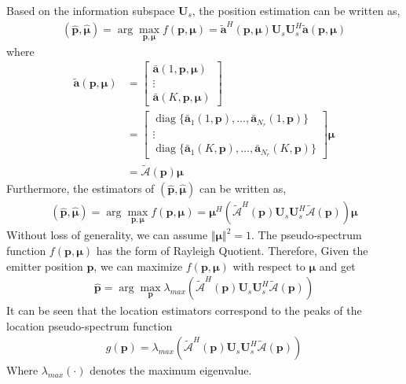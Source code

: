 \documentclass[journal,10pt]{IEEEtran}
\def \diag{\operatorname{diag}}
\def \arg{\operatorname{arg}}
\begin{document}
Based on the information subspace $\boldsymbol{U}_s$, the position estimation can be written as,
\begin{align}\label{eq:18}
    (\hat{\boldsymbol{p}},\hat{\boldsymbol{\mu}})=\arg \max_{\boldsymbol{p},\boldsymbol{\mu}} f(\boldsymbol{p},\boldsymbol{\mu})=\tilde{\boldsymbol{a}}^H(\boldsymbol{p},\boldsymbol{\mu})\boldsymbol{U}_s\boldsymbol{U}_s^H\tilde{\boldsymbol{a}}(\boldsymbol{p},\boldsymbol{\mu})
\end{align}
where 
\begin{align}\label{eq:19}
    \tilde{\boldsymbol{a}}(\boldsymbol{p},\boldsymbol{\mu})&=\left[
        \begin{array}{c}
            \bar{\boldsymbol{a}}(1,\boldsymbol{p},\boldsymbol{\mu})\\
            \vdots\\
            \bar{\boldsymbol{a}}(K,\boldsymbol{p},\boldsymbol{\mu})
        \end{array}
    \right]\\
    &=\left[
    \begin{array}{c}
        \diag\{\bar{\boldsymbol{a}}_1(1,\boldsymbol{p}),\dots,\bar{\boldsymbol{a}}_{N_r}(1,\boldsymbol{p})\}\\
        \vdots\\
        \diag\{\bar{\boldsymbol{a}}_1(K,\boldsymbol{p}),\dots,\bar{\boldsymbol{a}}_{N_r}(K,\boldsymbol{p})\}
    \end{array}        
    \right]\boldsymbol{\mu}\\
    &=\tilde{\mathcal{A}}(\boldsymbol{p})\boldsymbol{\mu}
\end{align}
Furthermore, the estimators of $(\hat{\boldsymbol{p}},\hat{\boldsymbol{\mu}})$ can be written as,
\begin{align}\label{eq:20}
    (\hat{\boldsymbol{p}},\hat{\boldsymbol{\mu}})=\arg \max_{\boldsymbol{p},\boldsymbol{\mu}} f(\boldsymbol{p},\boldsymbol{\mu})=\boldsymbol{\mu}^H(\tilde{\mathcal{A}}^H(\boldsymbol{p})\boldsymbol{U}_s\boldsymbol{U}_s^H\tilde{\mathcal{A}}(\boldsymbol{p}))\boldsymbol{\mu}
\end{align}
Without loss of generality, we can assume $\Vert \boldsymbol{\mu}\Vert ^2=1$. The pseudo-spectrum function $f(\boldsymbol{p},\boldsymbol{\mu})$ has the form of Rayleigh Quotient. 
Therefore, Given the emitter position $\boldsymbol{p}$, we can maximize $f(\boldsymbol{p},\boldsymbol{\mu})$ with respect to $\boldsymbol{\mu}$ and get
\begin{align}\label{eq:21}
    \hat{\boldsymbol{p}}=\arg \max_{\boldsymbol{p}} \lambda_{max}(\tilde{\mathcal{A}}^H(\boldsymbol{p})\boldsymbol{U}_s\boldsymbol{U}_s^H\tilde{\mathcal{A}}(\boldsymbol{p}))
\end{align}
It can be seen that the location estimators correspond to the peaks of the location pseudo-spectrum function
\begin{align}\label{eq:22}
    g(\boldsymbol{p})=\lambda_{max}(\tilde{\mathcal{A}}^H(\boldsymbol{p})\boldsymbol{U}_s\boldsymbol{U}_s^H\tilde{\mathcal{A}}(\boldsymbol{p}))
\end{align}
Where $\lambda_{max}(\cdot)$ denotes the maximum eigenvalue. 
\end{document}
